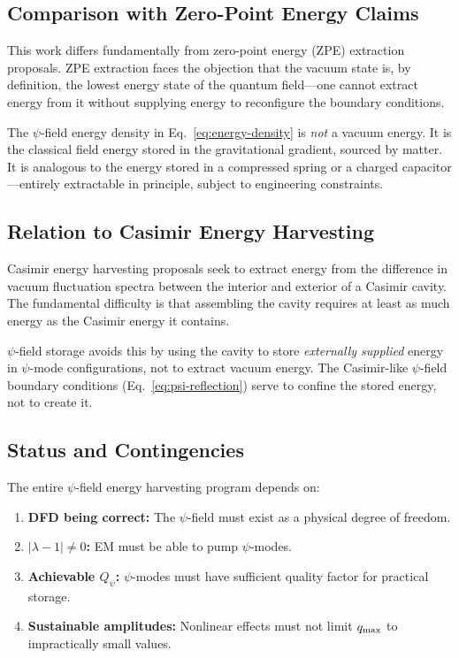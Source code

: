 \documentclass[aps,prd,twocolumn,showpacs,preprintnumbers,superscriptaddress,nofootinbib]{revtex4-2}
\begin{document}
\subsection{Comparison with Zero-Point Energy Claims}\label{sec:zpe}

This work differs fundamentally from zero-point energy (ZPE) extraction
proposals.  ZPE extraction faces the objection that the vacuum state is,
by definition, the lowest energy state of the quantum field---one cannot
extract energy from it without supplying energy to reconfigure the
boundary conditions.

The $\psi$-field energy density in Eq.~\eqref{eq:energy-density} is
\emph{not} a vacuum energy.  It is the classical field energy stored in
the gravitational gradient, sourced by matter.  It is analogous to the
energy stored in a compressed spring or a charged capacitor---entirely
extractable in principle, subject to engineering constraints.

\subsection{Relation to Casimir Energy Harvesting}\label{sec:casimir-harvest}

Casimir energy harvesting proposals seek to extract energy from the
difference in vacuum fluctuation spectra between the interior and
exterior of a Casimir cavity.  The fundamental difficulty is that
assembling the cavity requires at least as much energy as the
Casimir energy it contains.

$\psi$-field storage avoids this by using the cavity to store
\emph{externally supplied} energy in $\psi$-mode configurations,
not to extract vacuum energy.  The Casimir-like $\psi$-field
boundary conditions (Eq.~\ref{eq:psi-reflection}) serve to
confine the stored energy, not to create it.

\subsection{Status and Contingencies}\label{sec:status}

The entire $\psi$-field energy harvesting program depends on:

\begin{enumerate}
\item \textbf{DFD being correct:} The $\psi$-field must exist as a
physical degree of freedom.
\item \textbf{$|\lambda-1| \neq 0$:} EM must be able to pump $\psi$-modes.
\item \textbf{Achievable $Q_\psi$:} $\psi$-modes must have sufficient
quality factor for practical storage.
\item \textbf{Sustainable amplitudes:} Nonlinear effects must not limit
$q_{\rm max}$ to impractically small values.
\end{enumerate}
\end{document}

